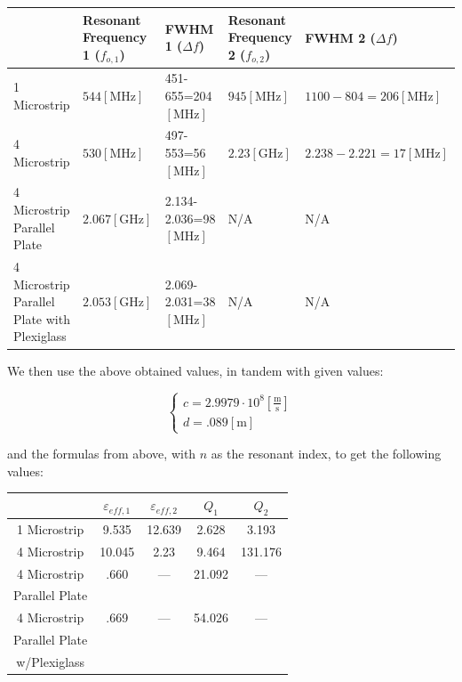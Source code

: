 \documentclass[
	letterpaper, %
	10pt, %
]{CSUniSchoolLabReport}
\begin{document}
\begin{center}
  \begin{tabular}[H]{|p{}|p{}|p{}|p{}|p{}|}
    \hline
    & Resonant Frequency 1 ($f_{o,1}$) & FWHM 1 ($\Delta f$) & Resonant Frequency 2 ($f_{o,2}$) & FWHM 2 ($\Delta f$)\\
    \hline
    1 Microstrip & $544[\si{\mega\hertz}]$ & 451-655=204$[\si{\mega\hertz}]$ & $945[\si{\mega\hertz}]$ & $1100-804=206[\si{\mega\hertz}]$\\
    \hline
    4 Microstrip & $530[\si{\mega\hertz}]$ & 497-553=56$[\si{\mega\hertz}]$ & $2.23[\si{\giga\hertz}]$ & $2.238-2.221=17[\si{\mega\hertz}]$\\
    \hline
    4 Microstrip Parallel Plate & $2.067[\si{\giga\hertz}]$ & 2.134-2.036=98$[\si{\mega\hertz}]$ & N/A & N/A\\
    \hline
    4 Microstrip Parallel Plate with Plexiglass & $2.053[\si{\giga\hertz}]$ & 2.069-2.031=38$[\si{\mega\hertz}]$ & N/A & N/A\\
    \hline
  \end{tabular}
\end{center}

We then use the above obtained values, in tandem with given values:

$$\left\{\begin{array}{l}c=2.9979\cdot10^8\left[ \frac{\si{\meter}}{\si{\second}} \right]\\d=.089[\si{\meter}]\end{array}$$

  and the formulas from above, with $n$ as the resonant index, to get the following values:

  \begin{center}
    \begin{tabular}[H]{|c|c|c|c|c|}
     \hline
     & $\varepsilon_{eff,1}$ & $\varepsilon_{eff,2}$ & $Q_1$ & $Q_2$\\
     \hline
     1 Microstrip & 9.535 & 12.639 & 2.628 & 3.193\\
     \hline
     4 Microstrip & 10.045 & 2.23 & 9.464 & 131.176\\
     \hline
     4 Microstrip & .660 & — & 21.092 & —\\
     Parallel Plate & & & & \\
     \hline
     4 Microstrip & .669 & —  & 54.026 & — \\
     Parallel Plate & & & & \\
     w/Plexiglass & & & & \\
     \hline
    \end{tabular}
  \end{center}
\end{document}
